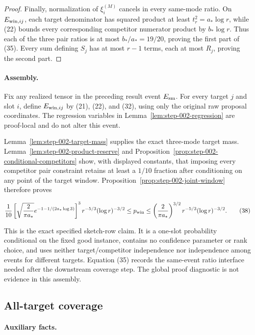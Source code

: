 \begin{proposition}
\begin{proof}
Finally, normalization of $\xi_i^{(M)}$ cancels in every same-mode ratio.
On $E_{{\rm win},ij}$, each target denominator has squared product at least
$t_r^2=a_*\log r$, while (22) bounds every corresponding competitor
numerator product by $b_*\log r$. Thus each of the three pair ratios is at
most $b_*/a_*=19/20$, proving the first part of (35). Every sum defining
$S_j$ has at most $r-1$ terms, each at most $R_j$, proving the second part.


\end{proof}
\end{proposition}
\paragraph{Assembly.}

Fix any realized tensor in the preceding result event $E_{\rm sm}$.
For every target $j$ and slot $i$, define $E_{{\rm win},ij}$ by (21),
(22), and (32), using only the original raw proposal coordinates. The
regression variables in Lemma~\ref{lem:step-002-regression} are proof-local
and do not alter this event.

Lemma~\ref{lem:step-002-target-mass} supplies the exact three-mode target
mass. Lemma~\ref{lem:step-002-product-reserve} and
Proposition~\ref{prop:step-002-conditional-competitors} show, with displayed
constants, that imposing every competitor pair constraint retains at least a
$1/10$ fraction after conditioning on any point of the target window.
Proposition~\ref{prop:step-002-joint-window} therefore proves

\[
{1\over10}\left[\sqrt{2\over\pi a_*}
e^{-1-1/(2a_*\log3)}\right]^3
r^{-5/3}(\log r)^{-3/2}
\le p_{\rm win}
\le
\left({2\over\pi a_*}\right)^{3/2}
r^{-5/3}(\log r)^{-3/2}.
\tag{38}
\]

This is the exact specified sketch-row claim. It is a one-slot probability
conditional on the fixed good instance, contains no confidence parameter or
rank choice, and uses neither target/competitor independence nor independence
among events for different targets. Equation (35) records the same-event
ratio interface needed after the downstream coverage step. The global proof
diagnostic is not evidence in this assembly.

\subsection{All-target coverage}\label{app:step-003}

\paragraph{Auxiliary facts.}

